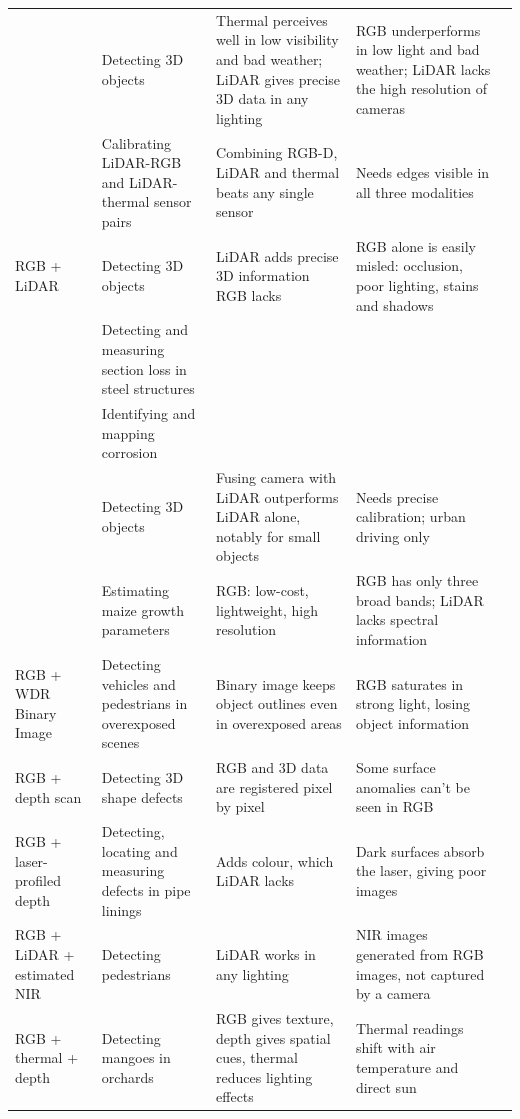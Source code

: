 {\begin{xltabular}{\textwidth}{>{\RaggedRight\arraybackslash}p{2.1cm}>{\RaggedRight\arraybackslash}p{2.9cm}>{\RaggedRight\arraybackslash}X>{\RaggedRight\arraybackslash}Xp{0.95cm}}
 & Detecting 3D objects & Thermal perceives well in low visibility and bad weather; LiDAR gives precise 3D data in any lighting & RGB underperforms in low light and bad weather; LiDAR lacks the high resolution of cameras & \citep{Tran2025} \\
 & Calibrating LiDAR-RGB and LiDAR-thermal sensor pairs & Combining RGB-D, LiDAR and thermal beats any single sensor & Needs edges visible in all three modalities & \citep{Yang2024} \\
\midrule
RGB + LiDAR & Detecting 3D objects & LiDAR adds precise 3D information RGB lacks & RGB alone is easily misled: occlusion, poor lighting, stains and shadows & \citep{Zhang2026d} \\
 & Detecting and measuring section loss in steel structures &  &  & \citep{Maru2025} \\
 & Identifying and mapping corrosion &  &  & \citep{PimenteldeFigueiredo2025} \\
 & Detecting 3D objects & Fusing camera with LiDAR outperforms LiDAR alone, notably for small objects & Needs precise calibration; urban driving only & \citep{Cheng2025} \\
 & Estimating maize growth parameters & RGB: low-cost, lightweight, high resolution & RGB has only three broad bands; LiDAR lacks spectral information & \citep{Tang2025} \\
\midrule
RGB + WDR Binary Image & Detecting vehicles and pedestrians in overexposed scenes & Binary image keeps object outlines even in overexposed areas & RGB saturates in strong light, losing object information & \citep{Byeon2026} \\
\midrule
RGB + depth scan & Detecting 3D shape defects & RGB and 3D data are registered pixel by pixel & Some surface anomalies can't be seen in RGB & \citep{Asad2026} \\
\midrule
RGB + laser-profiled depth & Detecting, locating and measuring defects in pipe linings & Adds colour, which LiDAR lacks & Dark surfaces absorb the laser, giving poor images & \citep{Gunatilake2021} \\
\midrule
RGB + LiDAR + estimated NIR & Detecting pedestrians & LiDAR works in any lighting & NIR images generated from RGB images, not captured by a camera & \citep{Wu2025} \\
\midrule
RGB + thermal + depth & Detecting mangoes in orchards & RGB gives texture, depth gives spatial cues, thermal reduces lighting effects & Thermal readings shift with air temperature and direct sun & \citep{Cao2026} \\

\end{xltabular}}
